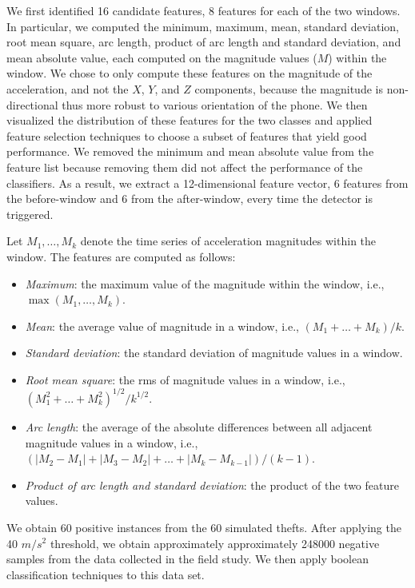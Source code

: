 \documentclass{soups}
\begin{document}
We first identified 16 candidate features, 8 features for each of the two windows.
In particular, we computed the minimum, maximum, mean, standard deviation, root mean square, arc length, product of arc length and standard deviation, and mean absolute value, each computed on the magnitude values ($M$) within the window.
We chose to only compute these features on the magnitude of the acceleration, and not the $X$, $Y$, and $Z$ components, because the magnitude is non-directional thus more robust to various orientation of the phone. 
We then visualized the distribution of these features for the two classes and applied feature selection techniques to choose a subset of features that yield good performance.
We removed the minimum and mean absolute value from the feature list because removing them did not affect the performance of the classifiers. 
As a result, we extract a 12-dimensional feature vector, 6 features from the before-window and 6 from the after-window, every time the detector is triggered.

Let $M_1,\dots,M_k$ denote the time series of acceleration magnitudes within the window.
The features are computed as follows:
\begin{itemize}
\item \emph{Maximum}: the maximum value of the magnitude within the window, i.e., $\max(M_1,\dots,M_k)$.
\item \emph{Mean}: the average value of magnitude in a window, i.e., $(M_1+\dots + M_k)/k$.
\item \emph{Standard deviation}: the standard deviation of magnitude values in a window.
\item \emph{Root mean square}: the rms of magnitude values in a window, i.e., $(M_1^2 + \dots + M_k^2)^{1/2}/k^{1/2}$.
\item \emph{Arc length}: the average of the absolute differences between all adjacent magnitude values in a window, i.e., $(|M_2-M_1| + |M_3-M_2| + \dots + |M_k-M_{k-1}|)/(k-1)$.
\item \emph{Product of arc length and standard deviation}: the product of the two feature values.
\end{itemize}

We obtain 60 positive instances from the 60 simulated thefts.
After applying the 40 $m/s^2$ threshold, we obtain approximately approximately 248000 negative samples from the data collected in the field study. 
We then apply boolean classification techniques to this data set.
\end{document}

